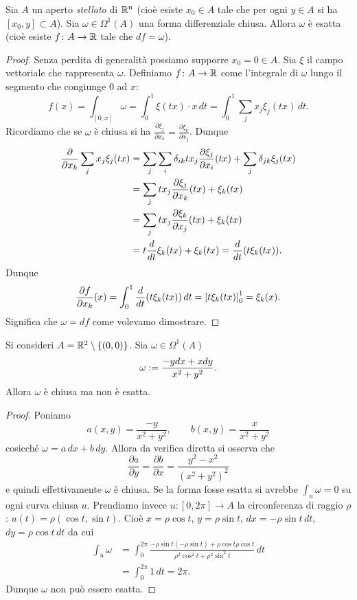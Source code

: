 \begin{theorem}
    \label{th:lemma-poincare}
Sia $A$ un aperto \emph{stellato} di ${\mathbb R}^n$
(cioè esiste $x_0\in A$ tale che per ogni $y\in A$ si ha $[x_0,y]\subset A$). 
Sia $\omega\in \Omega^1(A)$ una forma differenziale chiusa.
Allora $\omega$ è esatta 
(cioè esiste $f\colon A\to {\mathbb R}$ tale che $df = \omega$).
\end{theorem}
%
\begin{proof}
Senza perdita di generalità possiamo supporre $x_0 = 0 \in A$.
Sia $\xi$ il campo vettoriale che rappresenta $\omega$.
Definiamo $f\colon A\to{\mathbb R}$ come l'integrale di $\omega$ lungo il segmento 
che congiunge $0$ ad $x$:
\[
   f(x) = \int_{[0,x]} \omega = \int_0^1 \xi(tx)\cdot x\, dt 
   = \int_0^1 \sum_j x_j \xi_j(tx) \, dt.
\]
Ricordiamo che se $\omega$ è chiusa si ha 
$\frac{\partial \xi_j}{\partial x_k} = \frac{\partial \xi_k}{\partial x_j}$.
Dunque
\begin{align*}
 \frac{\partial}
 {\partial x_k}\sum_j x_j \xi_j(tx)
 &=  \sum_j \sum_i \delta_{ik} t x_j \frac{\partial \xi_j}{\partial x_i}(tx)
    + \sum_j \delta_{jk} \xi_j(tx)\\
 &= \sum_j t x_j \frac{\partial \xi_j}{\partial x_k}(tx) + \xi_k(tx)\\
 &= \sum_j t x_j \frac{\partial \xi_k}{\partial x_j}(tx) + \xi_k(tx)\\
 &= t \frac{d}{dt} \xi_k(tx) + \xi_k(tx) 
  = \frac{d}{dt} {\left( t \xi_k(tx) \right)}. 
\end{align*}
Dunque 
\[
 \frac{\partial f}{\partial x_k}(x) = \int_0^1 \frac{d}{dt} {\left( t\xi_k(tx) \right)}\, dt 
 = {\left[ t\xi_k(tx) \right]}_0^1 = \xi_k(x).
\]
Significa che $\omega = df$ come volevamo dimostrare.
\end{proof}


\begin{example}
Si consideri $A={\mathbb R}^2\setminus{\left\{ (0,0) \right\}}$.
Sia $\omega\in \Omega^1(A)$ 
\[
\omega := \frac{- y dx + x dy}{x^2+y^2}.
\]
Allora $\omega$ è chiusa ma non è esatta.
\end{example}
\begin{proof}
Poniamo
\[
a(x,y) = \frac{-y}{x^2+y^2},
\qquad 
b(x,y) = \frac{x}{x^2+y^2}
\]
cosicché $\omega = a\,dx + b\,dy$.
Allora da verifica diretta si osserva che 
\[
 \frac{\partial a}{\partial y} =
 \frac{\partial b}{\partial x} =
 \frac{y^2 - x^2}{(x^2+y^2)^2}
\]
e quindi effettivamente $\omega$ è chiusa.
Se la forma fosse esatta si avrebbe $\int_u \omega=0$ 
su ogni curva chiusa $u$.
Prendiamo invece $u\colon [0,2\pi]\to A$ la circonferenza
di raggio $\rho$:
$u(t) = \rho (\cos t,\sin t)$.
Cioè $x=\rho \cos t$, $y=\rho \sin t$, 
$dx = -\rho \sin t\,dt$, $dy=\rho \cos t\,dt$
da cui
\begin{align*}
\int_u \omega 
&= \int_0^{2\pi} \frac{-\rho \sin t (-\rho \sin t) + \rho \cos t \rho \cos t}{\rho^2\cos^2 t + \rho^2 \sin^2 t} \, dt\\
&= \int_0^{2\pi} 1\, dt = 2\pi. 
\end{align*}
Dunque $\omega$ non può essere esatta.
\end{proof}

